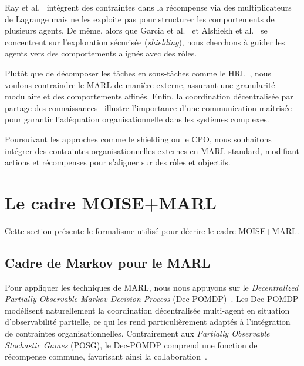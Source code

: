 \documentclass[francais,ROIA,Unicode,manuscript]{cedram}
\begin{document}
Ray et al.~\cite{ray2019benchmarking} intègrent des contraintes dans la récompense via des multiplicateurs de Lagrange mais ne les exploite pas pour structurer les comportements de plusieurs agents. De même, alors que Garcia et al.~\cite{garcia2015comprehensive} et Alshiekh et al.~\cite{alshiekh2018safe} se concentrent sur l'exploration sécurisée (\textit{shielding}), nous cherchons à guider les agents vers des comportements alignés avec des rôles.

Plutôt que de décomposer les tâches en sous-tâches comme le HRL~\cite{ghavamzadeh2006hrl}, nous voulons contraindre le MARL de manière externe, assurant une granularité modulaire et des comportements affinés. Enfin, la coordination décentralisée par partage des connaissances~\cite{foerster2018communication} illustre l'importance d'une communication maîtrisée pour garantir l'adéquation organisationnelle dans les systèmes complexes.

Poursuivant les approches comme le shielding ou le CPO, nous souhaitons intégrer des contraintes organisationnelles externes en MARL standard, modifiant actions et récompenses pour s'aligner sur des rôles et objectifs.


\section{Le cadre MOISE+MARL}
\label{sec:moise_marl_framework}

Cette section présente le formalisme utilisé pour décrire le cadre MOISE+MARL.

\subsection{Cadre de Markov pour le MARL}

Pour appliquer les techniques de MARL, nous nous appuyons sur le \textit{Decentralized Partially Observable Markov Decision Process} (Dec-POMDP)~\cite{Oliehoek2016}. Les Dec-POMDP modélisent naturellement la coordination décentralisée multi-agent en situation d'observabilité partielle, ce qui les rend particulièrement adaptés à l'intégration de contraintes organisationnelles. Contrairement aux \textit{Partially Observable Stochastic Games} (POSG), le Dec-POMDP comprend une fonction de récompense commune, favorisant ainsi la collaboration~\cite{Beynier2013}.
\end{document}
